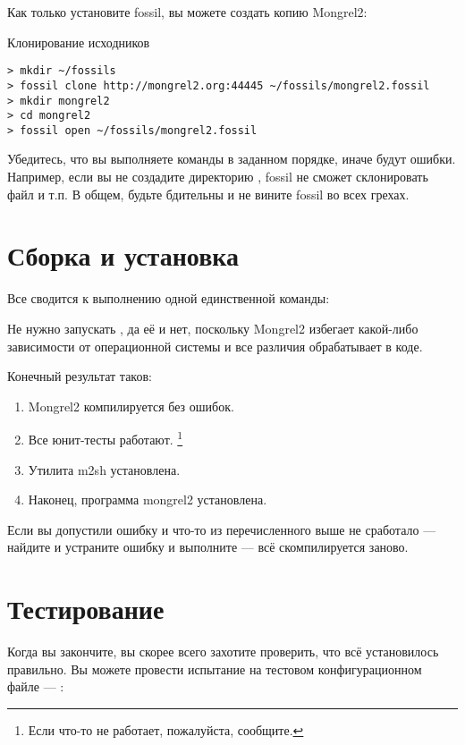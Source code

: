 Как только установите fossil, вы можете создать копию Mongrel2:

\begin{code}{Клонирование исходников}
\begin{lstlisting}
> mkdir ~/fossils
> fossil clone http://mongrel2.org:44445 ~/fossils/mongrel2.fossil
> mkdir mongrel2
> cd mongrel2
> fossil open ~/fossils/mongrel2.fossil
\end{lstlisting}
\end{code}

Убедитесь, что вы выполняете команды в заданном порядке, иначе будут ошибки.
Например, если вы не создадите директорию ,
fossil не сможет склонировать файл и т.п. В общем, будьте бдительны и не вините fossil
во всех грехах.

\section{Сборка и установка}

Все сводится к выполнению одной единственной команды: 

Не нужно запускать , да её и нет, поскольку Mongrel2 избегает
какой-либо зависимости от операционной системы и все различия обрабатывает в коде.

Конечный результат таков:

\begin{enumerate}
\item Mongrel2 компилируется без ошибок.
\item Все юнит-тесты работают. \footnote{Если что-то не работает, пожалуйста, сообщите.}
\item Утилита m2sh установлена.
\item Наконец, программа mongrel2 установлена.
\end{enumerate}

Если вы допустили ошибку и что-то из перечисленного выше не сработало --- найдите
и устраните ошибку и выполните  --- всё скомпилируется
заново.

\section{Тестирование}

Когда вы закончите, вы скорее всего захотите проверить, что всё установилось
правильно. Вы можете провести испытание на тестовом конфигурационном файле ---
:

